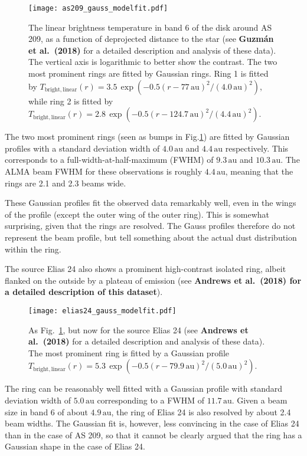 \documentclass{aa}
\begin{document}
\begin{figure}
\centerline{\texttt{[image: as209\_gauss\_modelfit.pdf]}}
\caption{\label{fig-obs-as209}The linear brightness temperature in band 6 of the
  disk around AS 209, as a function of deprojected distance to the star (see
  {\bf Guzm\'an et al.~(2018)} for a detailed description and analysis of these data). The
  vertical axis is logarithmic to better show the contrast. The two most
  prominent rings are fitted by Gaussian rings. Ring 1 is fitted by
  $T_{\mathrm{bright,linear}}(r)=
  3.5\,\exp(-0.5(r-77\,\mathrm{au})^2/(4.0\,\mathrm{au})^2)$, while ring 2 is fitted by
  $T_{\mathrm{bright,linear}}(r)=
  2.8\,\exp(-0.5(r-124.7\,\mathrm{au})^2/(4.4\,\mathrm{au})^2)$.}
\end{figure}

The two most prominent rings (seen as bumps in Fig.\ref{fig-obs-as209}) are
fitted by Gaussian profiles with a standard deviation width of
$4.0\,\mathrm{au}$ and $4.4\,\mathrm{au}$ respectively. This corresponds to a
full-width-at-half-maximum (FWHM) of $9.3\,\mathrm{au}$ and $10.3\,\mathrm{au}$.
The ALMA beam FWHM for these observations is roughly $4.4\,\mathrm{au}$, meaning
that the rings are 2.1 and 2.3 beams wide.

These Gaussian profiles fit the observed data remarkably well, even in the wings
of the profile (except the outer wing of the outer ring). This is somewhat
surprising, given that the rings are resolved. The Gauss profiles therefore do
not represent the beam profile, but tell something about the actual dust
distribution within the ring.

The source Elias 24 also shows a prominent high-contrast isolated ring,
albeit flanked on the outside by a plateau of emission (see {\bf Andrews
  et al.~(2018) for a detailed description of this dataset}). 

\begin{figure}
\centerline{\texttt{[image: elias24\_gauss\_modelfit.pdf]}}
\caption{\label{fig-obs-elias24}As Fig.~\ref{fig-obs-as209}, but now for the
  source Elias 24 (see {\bf Andrews et al.~(2018)} for a detailed description
  and analysis of these data). The most prominent ring is fitted by a Gaussian
  profile $T_{\mathrm{bright,linear}}(r)=
  5.3\,\exp(-0.5(r-79.9\,\mathrm{au})^2/(5.0\,\mathrm{au})^2)$.}
\end{figure}

The ring can be reasonably well fitted with a Gaussian profile with standard
deviation width of $5.0\,\mathrm{au}$ corresponding to a FWHM of
$11.7\,\mathrm{au}$. Given a beam size in band 6 of about $4.9\,\mathrm{au}$,
the ring of Elias 24 is also resolved by about 2.4 beam widths. The Gaussian fit
is, however, less convincing in the case of Elias 24 than in the case of AS 209,
so that it cannot be clearly argued that the ring has a Gaussian shape in the
case of Elias 24.
\end{document}
